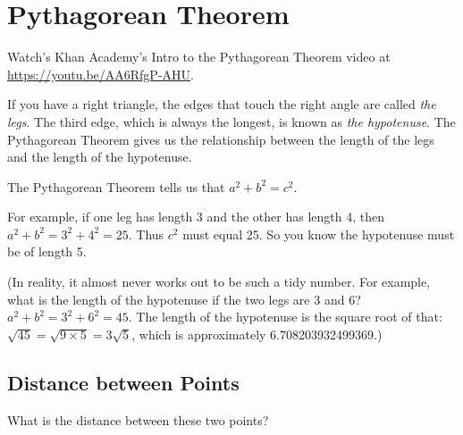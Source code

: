 \chapter{Pythagorean Theorem}

Watch's Khan Academy's Intro to the Pythagorean Theorem video at \url{https://youtu.be/AA6RfgP-AHU}.

If you have a right triangle, the edges that touch the right angle are
called \emph{the legs}.  The third edge, which is always the longest,
is known as \emph{the hypotenuse}. The Pythagorean Theorem gives us
the relationship between the length of the legs and the length of the
hypotenuse.


The Pythagorean Theorem tells us that $a^2 + b^2 = c^2$.

For example, if one leg has length 3 and the other has length 4, then
$a^2 + b^2 = 3^2 + 4^2 = 25$. Thus $c^2$ must equal 25. So you know
the hypotenuse must be of length 5.

(In reality, it almost never works out to be such a tidy number. For
example, what is the length of the hypotenuse if the two legs are 3
and 6? $a^2 + b^2 = 3^2 + 6^2 = 45$.  The length of the hypotenuse is
the square root of that: $\sqrt{45} = \sqrt{9 \times 5} = 3 \sqrt{5}$,
which is approximately 6.708203932499369.)

\section{Distance between Points}

What is the distance between these two points?



